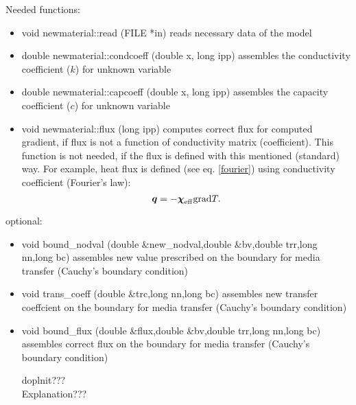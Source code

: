 Needed functions:
\begin{itemize}
\item{
{\sf void newmaterial::read (FILE *in)}
\newline reads necessary data of the model
}
\item{
{\sf double newmaterial::condcoeff (double x, long ipp)}
\newline assembles the conductivity coefficient ($k$) for unknown variable
}

\item{
{\sf double newmaterial::capcoeff (double x, long ipp)}
\newline assembles the capacity coefficient ($c$) for unknown variable
}

\item{
{\sf void newmaterial::flux (long ipp)}
\newline computes correct flux for computed gradient, if flux is not a function of conductivity matrix (coefficient).
This function is not needed, if the flux is defined with this mentioned (standard) way.
For example, heat flux is defined (see eq. \eqref{fourier}) using conductivity coefficient (Fourier's law):
\begin{equation}
\mbox{\boldmath$q$} = - \mbox{\boldmath$\chi$}_{\rm eff} {\rm grad} T.\nonumber
\end{equation}
}
\end{itemize}

optional:
\begin{itemize}
\item 
{\sf void bound\_nodval (double \&new\_nodval,double \&bv,double trr,long nn,long bc)}
\newline assembles new value prescribed on the boundary for media transfer (Cauchy's boundary condition)

\item 
{\sf void trans\_coeff (double \&trc,long nn,long bc)}
\newline assembles new transfer coeffcient on the boundary for media transfer (Cauchy's boundary condition)

\item 
{\sf void bound\_flux (double \&flux,double \&bv,double trr,long nn,long bc)}
\newline assembles correct flux on the boundary for media transfer (Cauchy's boundary condition)

doplnit???\\


Explanation???\\

\end{itemize}

